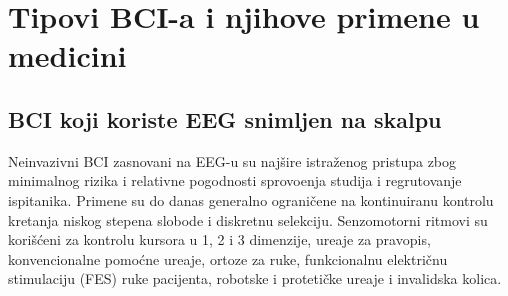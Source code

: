 \documentclass[conference]{IEEEtran}
\begin{document}
\section{Tipovi BCI-a i njihove primene u medicini}
\subsection{BCI koji koriste EEG snimljen na skalpu}
Neinvazivni BCI zasnovani na EEG-u su najšire istraženog pristupa zbog minimalnog rizika i relativne pogodnosti sprovo\dj enja studija i regrutovanje ispitanika. Primene su do danas generalno ograničene na kontinuiranu kontrolu kretanja niskog stepena slobode i diskretnu selekciju. Senzomotorni ritmovi su korišćeni za kontrolu kursora u 1, 2 i 3 dimenzije, ure\dj aje za pravopis, konvencionalne pomoćne ure\dj aje, ortoze za ruke, funkcionalnu električnu stimulaciju (FES) ruke pacijenta, robotske i protetičke ure\dj aje i invalidska kolica.\\
\end{document}
